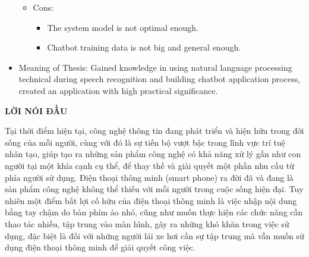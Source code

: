 \documentclass[12pt]{report}
\begin{document}
\begin{itemize}
\begin{itemize}
\begin{itemize}
		\end{itemize}
		\item Cons:
		\begin{itemize}
			\item The system model is not optimal enough.
			\item Chatbot training data is not big and general enough.
		\end{itemize}
	\end{itemize}
	\item Meaning of Thesis: Gained knowledge in using natural language processing technical during speech recognition and building chatbot application process, created an application with high practical significance.
\end{itemize}

\newpage
\tableofcontents

\newpage
\listoffigures
{}

\newpage
\listoftables
{}

\newpage
\lstlistoflistings
{}






\newpage
\begin{center}
{\large \textbf{LỜI NÓI ĐẦU}}
\end{center}
Tại thời điểm hiện tại, công nghệ thông tin đang phát triển và hiện hữu trong đời sống của mỗi người, cùng với đó là sự tiến bộ vượt bậc trong lĩnh vực trí tuệ nhân tạo, giúp tạo ra những sản phẩm công nghệ có khả năng xử lý gần như con người tại một khía cạnh cụ thể, để thay thế và giải quyết một phần nhu cầu từ phía người sử dụng. Điện thoại thông minh (smart phone) ra đời đã và đang là sản phẩm công nghệ không thể thiếu với mỗi người trong cuộc sống hiện đại. Tuy nhiên một điểm bất lợi cố hữu của điện thoại thông minh là việc nhập nội dung bằng tay chậm do bàn phím ảo nhỏ, cũng như muốn thực hiện các chức năng cần thao tác nhiều, tập trung vào màn hình, gây ra những khó khăn trong việc sử dụng, đặc biệt là đối với những người lái xe hơi cần sự tập trung mà vẫn muốn sử dụng điện thoại thông minh để giải quyết công việc.
\end{document}
